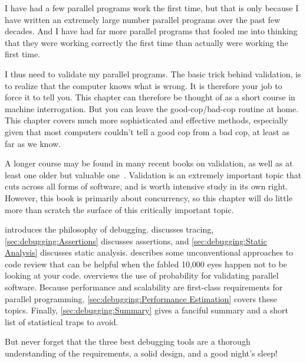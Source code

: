 
%

I have had a few parallel programs work the first time, but that is only
because I have written an extremely large number parallel programs over
the past few decades.
And I have had far more parallel programs that fooled me into thinking
that they were working correctly the first time than actually were working
the first time.

I thus need to validate my parallel programs.
The basic trick behind validation, is to realize that the computer knows
what is wrong.
It is therefore your job to force it to tell you.
This chapter can therefore be thought of as a short course in
machine interrogation.
But you can leave the good-cop/bad-cop routine at home.
This chapter covers much more sophisticated and effective methods,
especially given that most computers couldn't tell a good cop from a
bad cop, at least as far as we know.

A longer course may be found in many recent books on validation, as
well as at least one older but valuable
one~\cite{GlenfordJMyers1979}.
Validation is an extremely important topic that cuts across all forms
of software, and is worth intensive study in its own right.
However, this book is primarily about concurrency, so this chapter will do
little more than scratch the surface of this critically important topic.

introduces the philosophy of debugging.
discusses tracing,
\cref{sec:debugging:Assertions}
discusses assertions, and
\cref{sec:debugging:Static Analysis}
discusses static analysis.
describes some unconventional approaches to code review that can
be helpful when the fabled 10,000 eyes happen not to be looking at your code.
overviews the use of probability for validating parallel software.
Because performance and scalability are first-class requirements
for parallel programming,
\cref{sec:debugging:Performance Estimation} covers these
topics.
Finally,
\cref{sec:debugging:Summary}
gives a fanciful summary and a short list of statistical traps to avoid.

But never forget that the three best debugging tools are a thorough
understanding of the requirements, a solid design, and a good night's
sleep!

